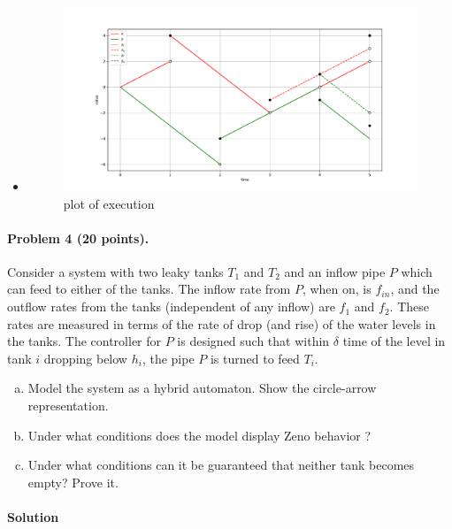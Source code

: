 \documentclass[11pt]{article}
\begin{document}
\begin{itemize}
\item

\begin{figure}[h]
  \includegraphics[width=\linewidth]{plot}
  \caption{plot of execution}
  \label{}
\end{figure}
\end{itemize}

\paragraph{Problem 4 (20 points).}
Consider a system with two leaky tanks $T_1$ and $T_2$ and an inflow pipe $P$
which can feed to either of the tanks. The inflow rate from $P$, when on, is $f_{in}$, and the outflow
rates from the tanks (independent of any inflow) are $f_1$ and $f_2$. These rates are measured in terms
of the rate of drop (and rise) of the water levels in the tanks. The controller for $P$ is designed such that
within $\delta$ time of the level in tank $i$ dropping below $h_i$, the pipe $P$ is turned to feed $T_i$.
\begin{enumerate}[(a)]
	\item Model the system as a hybrid automaton. Show the circle-arrow representation.
	\item Under what conditions does the model display Zeno behavior ?
	\item Under what conditions can it be guaranteed that neither tank becomes empty? Prove it.
\end{enumerate}

\paragraph{Solution}
\end{document}
